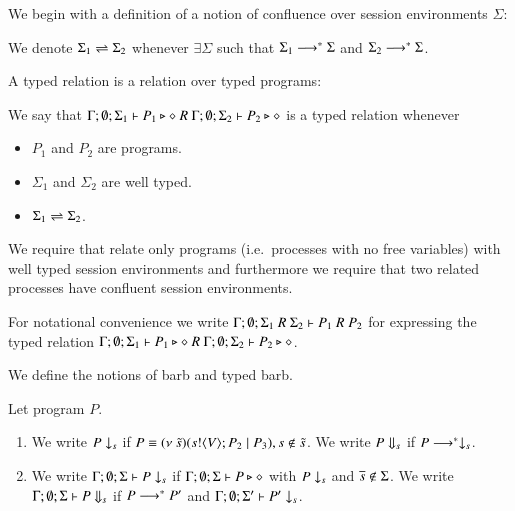We begin with a definition of a notion of confluence
over session environments $\Sigma$:
\begin{definition}\rm
	We denote $\Sigma_1 \rightleftharpoons \Sigma_2$ whenever $\exists \Sigma$ such that
	$\Sigma_1 \longrightarrow^* \Sigma$ and $\Sigma_2 \longrightarrow^* \Sigma$.
\end{definition}


A typed relation is a relation over typed programs:

\begin{definition}\rm
	We say that
	$\Gamma; \emptyset; \Sigma_1 \vdash P_1 \triangleright \diamond\ R\ \Gamma; \emptyset; \Sigma_2 \vdash P_2 \triangleright \diamond$
	is a typed relation whenever
	\begin{itemize}
		\item	$P_1$ and $P_2$ are programs.
		\item	$\Sigma_1$ and $\Sigma_2$ are well typed.
		\item	$\Sigma_1 \rightleftharpoons \Sigma_2$.
	\end{itemize}
\end{definition}

We require that relate only programs (i.e.\ processes with no free variables) with
well typed session environments and furthermore we require that two related processes
have confluent session environments.

For notational convenience we write $\Gamma; \emptyset; \Sigma_1\ R\ \Sigma_2 \vdash P_1\ R\ P_2$
for expressing the typed relation $\Gamma; \emptyset; \Sigma_1 \vdash P_1 \triangleright \diamond\ R\ \Gamma; \emptyset; \Sigma_2 \vdash P_2 \triangleright \diamond$.

We define the notions of barb and typed barb.

\begin{definition}[Barbs]\rm
	Let program $P$.
	\begin{enumerate}

		\item	We write $P \downarrow_{s}$ if $P \equiv (\nu\ \tilde{s})(s ! \langle V \rangle ; P_2 \;|\; P_3), s \notin \tilde{s}$.
			We write $P \Downarrow_{s}$ if $P \longrightarrow^* \downarrow_{s}$.

		\item	We write $\Gamma; \emptyset; \Sigma \vdash P \downarrow_{s}$ if
			$\Gamma; \emptyset; \Sigma \vdash P \triangleright \diamond$ with $P \downarrow_{s}$ and $\overline{s} \notin \Sigma$.
			We write $\Gamma; \emptyset; \Sigma \vdash P \Downarrow_{s}$ if $P \longrightarrow^* P'$ and
			$\Gamma; \emptyset; \Sigma' \vdash P' \downarrow_{s}$.			
	\end{enumerate}
\end{definition}


